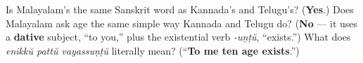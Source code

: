 \begin{tcolorbox}[breakable,colback=teal!4,colframe=teal!35!black,title={Before you move on}]
Is Malayalam's \textbf{} the same Sanskrit word as Kannada's and Telugu's? (\textbf{Yes}.) Does Malayalam ask age the same simple way Kannada and Telugu do? (\textbf{No} — it uses a \textbf{dative} subject, \textquotedblleft{}to you,\textquotedblright{} plus the existential verb \emph{-uṇṭŭ}, \textquotedblleft{}exists.\textquotedblright{}) What does \emph{enikkŭ pattŭ vayassuṇṭŭ} literally mean? (\textquotedblleft{}\textbf{To me ten age exists}.\textquotedblright{})
\end{tcolorbox}
